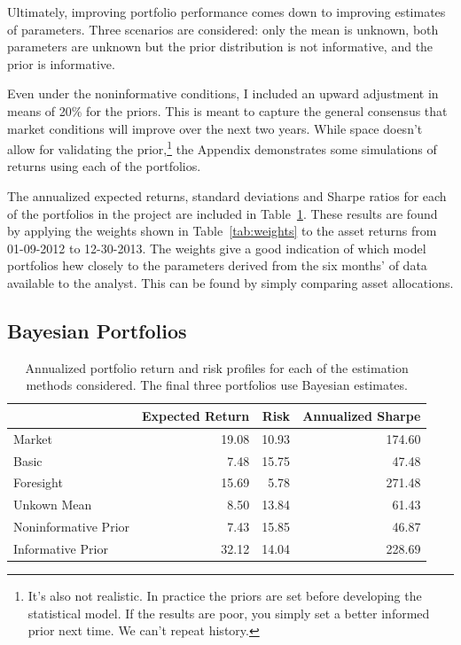 \documentclass[a4paper]{article}\usepackage[]{graphicx}\usepackage[]{color}
\begin{document}
Ultimately, improving portfolio performance comes down to improving estimates of parameters. Three scenarios are considered: only the mean is unknown, both parameters are unknown but the prior distribution is not informative, and the prior is informative.

Even under the noninformative conditions, I included an upward adjustment in means of 20\% for the priors. This is meant to capture the general consensus that market conditions will improve over the next two years. While space doesn't allow for validating the prior,\footnote{It's also not realistic. In practice the priors are set before developing the statistical model. If the results are poor, you simply set a better informed prior next time. We can't repeat history.} the Appendix demonstrates some simulations of returns using each of the portfolios. 

The annualized expected returns, standard deviations and Sharpe ratios for each of the portfolios in the project are included in Table~\ref{tab:results}. These results are found by applying the weights shown in Table~\ref{tab:weights} to the asset returns from 01-09-2012 to 12-30-2013. The weights give a good indication of which model portfolios hew closely to the parameters derived from the six months' of data available to the analyst. This can be found by simply comparing asset allocations.

\subsection{Bayesian Portfolios}

\begin{table}[ht]
\centering
\begin{tabular}{lrrr}
  \hline
 & Expected Return & Risk & Annualized Sharpe \\ 
  \hline
Market & 19.08 & 10.93 & 174.60 \\ 
  Basic & 7.48 & 15.75 & 47.48 \\ 
  Foresight & 15.69 & 5.78 & 271.48 \\ 
  Unkown Mean & 8.50 & 13.84 & 61.43 \\ 
  Noninformative Prior & 7.43 & 15.85 & 46.87 \\ 
  Informative Prior & 32.12 & 14.04 & 228.69 \\ 
   \hline
\end{tabular}
\caption{Annualized portfolio return and risk profiles for each of the estimation methods considered. The final three portfolios use Bayesian estimates.} 
\label{tab:results}
\end{table}
\end{document}
